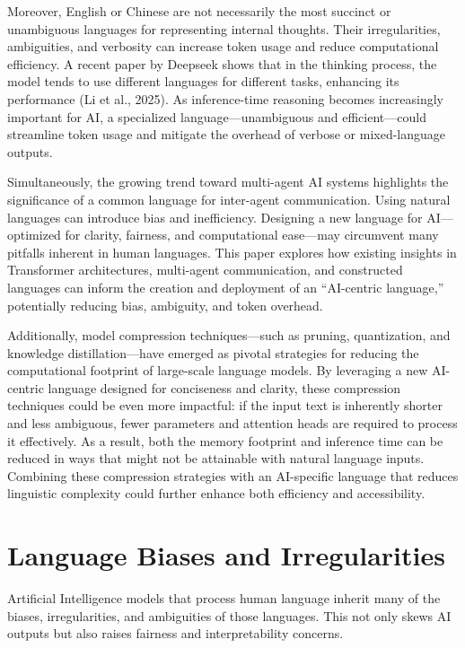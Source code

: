 \documentclass{article} %
\begin{document}
Moreover, English or Chinese are not necessarily the most succinct or unambiguous languages for representing internal thoughts. Their irregularities, ambiguities, and verbosity can increase token usage and reduce computational efficiency. A recent paper by Deepseek shows that in the thinking process, the model tends to use different languages for different tasks, enhancing its performance (Li et al., 2025). As inference-time reasoning becomes increasingly important for AI, a specialized language—unambiguous and efficient—could streamline token usage and mitigate the overhead of verbose or mixed-language outputs.

Simultaneously, the growing trend toward multi-agent AI systems highlights the significance of a common language for inter-agent communication. Using natural languages can introduce bias and inefficiency. Designing a new language for AI—optimized for clarity, fairness, and computational ease—may circumvent many pitfalls inherent in human languages. This paper explores how existing insights in Transformer architectures, multi-agent communication, and constructed languages can inform the creation and deployment of an “AI-centric language,” potentially reducing bias, ambiguity, and token overhead.

Additionally, model compression techniques—such as pruning, quantization, and knowledge distillation—have emerged as pivotal strategies for reducing the computational footprint of large-scale language models. By leveraging a new AI-centric language designed for conciseness and clarity, these compression techniques could be even more impactful: if the input text is inherently shorter and less ambiguous, fewer parameters and attention heads are required to process it effectively. As a result, both the memory footprint and inference time can be reduced in ways that might not be attainable with natural language inputs. Combining these compression strategies with an AI-specific language that reduces linguistic complexity could further enhance both efficiency and accessibility.

\section{Language Biases and Irregularities}
Artificial Intelligence models that process human language inherit many of the biases, irregularities, and ambiguities of those languages. This not only skews AI outputs but also raises fairness and interpretability concerns.
\end{document}
